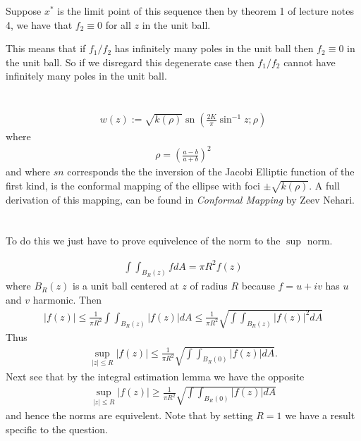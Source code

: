 \documentclass{unswmaths}
\begin{document}
Suppose $ x^* $ is the limit point of this sequence then by theorem 1 of lecture notes 4, we have that $ f_2 \equiv 0 $ for all $ z $ in the unit ball. 

This means that if $ f_1 / f_2 $ has infinitely many poles in the unit ball then $ f_2 \equiv 0 $ in the unit ball. So if we disregard this degenerate case then $ f_1 / f_2 $ cannot have infinitely many poles in the unit ball.

\section{}
\begin{align*}
    w(z) := \sqrt{k(\rho)} \operatorname{sn}\left( \frac{2K}{\pi} \sin^{-1} z ;\rho \right)
\end{align*}
where
\begin{align*}
    \rho = \left( \frac{a-b}{a+b}\right)^2
\end{align*}
and where $ sn $ corresponds the the inversion of the Jacobi Elliptic function of the first kind,
is the conformal mapping of the ellipse with foci $ \pm \sqrt{k(\rho)} $. A full derivation of this mapping, can be found in \emph{Conformal Mapping} by Zeev Nehari.
\section{}

To do this we just have to prove equivelence of the norm to the $\sup $ norm.

\begin{align*}
    \int \int_{B_{R}(z)} f dA = \pi R^2 f(z) 
\end{align*} 
where $ B_{R}(z) $ is a unit ball centered at $ z $ of radius $ R $ because $ f = u + iv $ has $ u $ and $ v $ harmonic.
Then
\begin{align*}
    |f(z)| \leq \frac{1}{\pi R^2}\int \int_{B_{R}(z)} |f(z)| dA \leq \frac{1}{\pi R^2} \sqrt{\int \int_{B_{R}(z)} |f(z)|^2 dA}
\end{align*}
Thus 
\begin{align*}
    \sup_{|z| \leq R} |f(z)| \leq \frac{1}{\pi R^2} \sqrt{\int \int_{B_{R}(0)}|f(z)|dA}.
\end{align*}
Next see that by the integral estimation lemma we have the opposite
\begin{align*}
     \sup_{|z| \leq R} |f(z)| \geq \frac{1}{\pi R^2} \sqrt{\int \int_{B_{R}(0)}|f(z)|dA}   
\end{align*}
and hence the norms are equivelent. Note that by setting $ R = 1 $ we have a result specific to the question.
\end{document}
